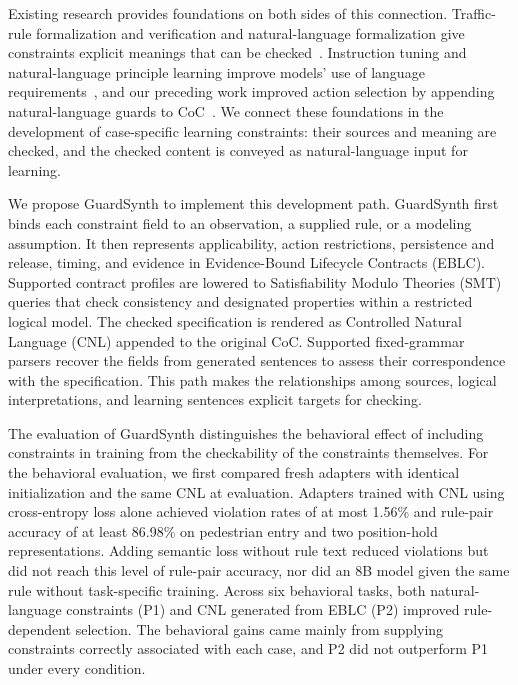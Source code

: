 Existing research provides foundations on both sides of this connection. Traffic-rule formalization and verification and natural-language formalization give constraints explicit meanings that can be checked~\cite{r6,Wan2024,r8,r9}. Instruction tuning and natural-language principle learning improve models' use of language requirements~\cite{Wei2022,Bai2022,Guan2024}, and our preceding work improved action selection by appending natural-language guards to CoC~\cite{r4}. We connect these foundations in the development of case-specific learning constraints: their sources and meaning are checked, and the checked content is conveyed as natural-language input for learning.\par

We propose GuardSynth to implement this development path. GuardSynth first binds each constraint field to an observation, a supplied rule, or a modeling assumption. It then represents applicability, action restrictions, persistence and release, timing, and evidence in Evidence-Bound Lifecycle Contracts (EBLC). Supported contract profiles are lowered to Satisfiability Modulo Theories (SMT) queries that check consistency and designated properties within a restricted logical model. The checked specification is rendered as Controlled Natural Language (CNL) appended to the original CoC. Supported fixed-grammar parsers recover the fields from generated sentences to assess their correspondence with the specification. This path makes the relationships among sources, logical interpretations, and learning sentences explicit targets for checking.\par

The evaluation of GuardSynth distinguishes the behavioral effect of including constraints in training from the checkability of the constraints themselves. For the behavioral evaluation, we first compared fresh adapters with identical initialization and the same CNL at evaluation. Adapters trained with CNL using cross-entropy loss alone achieved violation rates of at most 1.56\% and rule-pair accuracy of at least 86.98\% on pedestrian entry and two position-hold representations. Adding semantic loss without rule text reduced violations but did not reach this level of rule-pair accuracy, nor did an 8B model given the same rule without task-specific training. Across six behavioral tasks, both natural-language constraints (P1) and CNL generated from EBLC (P2) improved rule-dependent selection. The behavioral gains came mainly from supplying constraints correctly associated with each case, and P2 did not outperform P1 under every condition.\par


